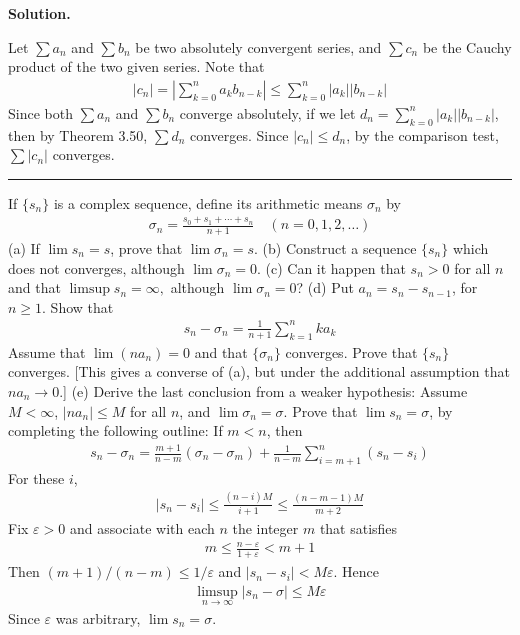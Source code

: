 \documentclass[12pt]{article}
\theoremstyle{definition}
\begin{document}
\smallskip
\noindent\textbf{Solution.}\quad

Let $\sum a_n$ and $\sum b_n$ be two absolutely convergent series, and $\sum c_n$ be the Cauchy product of the two given series. Note that
\begin{align*}
\left\vert c_n\right\vert
=\left\vert\sum_{k=0}^na_kb_{n-k}\right\vert
\le\sum_{k=0}^n\left\vert a_k\right\vert\left\vert b_{n-k}\right\vert
\end{align*}
Since both $\sum a_n$ and $\sum b_n$ converge absolutely, if we let $d_n=\sum_{k=0}^n\left\vert a_k\right\vert\left\vert b_{n-k}\right\vert$, then by Theorem 3.50, $\sum d_n$ converges. Since $\left\vert c_n\right\vert\le d_n$, by the comparison test, $\sum\left\vert c_n\right\vert$ converges.



\bigskip\noindent\hrule\bigskip

If $\{s_n\}$ is a complex sequence, define its arithmetic means $\sigma_n$ by
\begin{align*}
\sigma_n=\frac{s_0+s_1+\cdots+s_n}{n+1}\quad (n=0,1,2,\ldots)
\end{align*}
(a) If $\lim s_n=s$, prove that $\lim\sigma_n=s$.
(b) Construct a sequence $\{s_n\}$ which does not converges, although $\lim\sigma_n=0$.
(c) Can it happen that $s_n>0$ for all $n$ and that $\limsup s_n=\infty,$ although $\lim\sigma_n=0$?
(d) Put $a_n=s_n-s_{n-1}$, for $n\ge 1$. Show that
\begin{align*}
s_n-\sigma_n=\frac{1}{n+1}\sum_{k=1}^nka_k
\end{align*}
Assume that $\lim(na_n)=0$ and that $\{\sigma_n\}$ converges. Prove that $\{s_n\}$ converges. [This gives a converse of (a), but under the additional assumption that $na_n\to 0$.]
(e) Derive the last conclusion from a weaker hypothesis: Assume $M<\infty$, $\left\vert na_n\right\vert\le M$ for all $n$, and $\lim\sigma_n=\sigma$. Prove that $\lim s_n=\sigma$, by completing the following outline:
If $m<n$, then
\begin{align*}
s_n-\sigma_n=\frac{m+1}{n-m}\left(\sigma_n-\sigma_m\right)+\frac{1}{n-m}\sum_{i=m+1}^n\left(s_n-s_i\right)
\end{align*}
For these $i$,
\begin{align*}
\left\vert s_n-s_i\right\vert\le\frac{(n-i)M}{i+1}\le\frac{(n-m-1)M}{m+2}
\end{align*}
Fix $\varepsilon>0$ and associate with each $n$ the integer $m$ that satisfies
\begin{align*}
m\le\frac{n-\varepsilon}{1+\varepsilon}<m+1
\end{align*}
Then $(m+1)/(n-m)\le1/\varepsilon$ and $\left\vert s_n-s_i\right\vert<M\varepsilon$. Hence
\begin{align*}
\limsup_{n\to\infty}\left\vert s_n-\sigma\right\vert\le M\varepsilon
\end{align*}
Since $\varepsilon$ was arbitrary, $\lim s_n=\sigma$.
\end{document}
